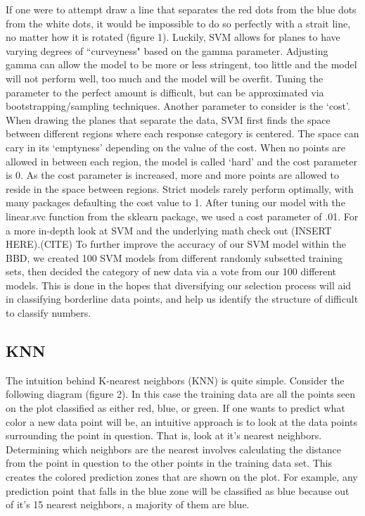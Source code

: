 \documentclass[11pt, oneside]{article}   	%
\begin{document}
If one were to attempt draw a line that separates the red dots from the blue dots from the white dots, it would be impossible to do so perfectly with a strait line, no matter how it is rotated (figure 1). Luckily, SVM allows for planes to have varying degrees of ``curveyness" based on the gamma parameter. Adjusting gamma can allow the model to be more or less stringent, too little and the model will not perform well, too much and the model will be overfit. Tuning the parameter to the perfect amount is difficult, but can be approximated via bootstrapping/sampling techniques. Another parameter to consider is the `cost'. When drawing the planes that separate the data, SVM first finds the space between different regions where each response category is centered. The space can cary in its `emptyness' depending on the value of the cost. When no points are allowed in between each region, the model is called `hard' and the cost parameter is 0. As the cost parameter is increased, more and more points are allowed to reside in the space between regions. Strict models rarely perform optimally, with many packages defaulting the cost value to 1. After tuning our model with the linear.svc function from the sklearn package, we used a cost parameter of .01. For a more in-depth look at SVM and the underlying math check out (INSERT HERE).(CITE)
To further improve the accuracy of our SVM model within the BBD, we created 100 SVM models from different randomly subsetted training sets, then decided the category of new data via a vote from our 100 different models. This is done in the hopes that diversifying our selection process will aid in classifying borderline data points, and help us identify the structure of difficult to classify numbers.
\subsection{KNN}
The intuition behind K-nearest neighbors (KNN) is quite simple. Consider the following diagram (figure 2). In this case the training data are all the points seen on the plot classified as either red, blue, or green. If one wants to predict what color a new data point will be, an intuitive approach is to look at the data points surrounding the point in question. That is, look at it's nearest neighbors. Determining which neighbors are the nearest involves calculating the distance from the point in question to the other points in the training data set. This creates the colored prediction zones that are shown on the plot. For example, any prediction point that falls in the blue zone will be classified as blue because out of it's 15 nearest neighbors, a majority of them are blue. 
\end{document}
